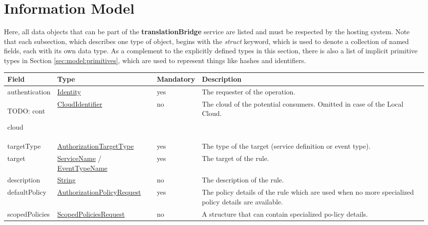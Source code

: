 \documentclass[a4paper]{arrowhead}
\newcommand{\pref}[1]{{\textcolor{ArrowheadGrey}{\hyperref[sec:model:primitives:#1]{#1}}}}
\begin{document}
\clearpage

\section{Information Model}
\label{sec:model}

Here, all data objects that can be part of the \textbf{translationBridge} service are listed and must be respected by the hosting system.
Note that each subsection, which describes one type of object, begins with the \textit{struct} keyword, which is used to denote a collection of named fields, each with its own data type.
As a complement to the explicitly defined types in this section, there is also a list of implicit primitive types in Section \ref{sec:model:primitives}, which are used to represent things like hashes and identifiers.

{}
 
\begin{table}[ht!]
\begin{tabularx}{\textwidth}{| p{3cm} | p{4.5cm} | p{2cm} | X |} \hline
\rowcolor{gray!33} Field & Type & Mandatory & Description \\ \hline
authentication &\hyperref[sec:model:Identity]{Identity} & yes & The requester of the operation. \\ \hline

TODO: cont

cloud & \pref{CloudIdentifier} & no & The cloud of the potential consumers. Omitted in case of the Local Cloud. \\ \hline
targetType & \pref{AuthorizationTargetType} & yes & The type of the target (service definition or event type). \\ \hline
target & \pref{ServiceName} / \pref{EventTypeName} & yes & The target of the rule. \\ \hline
description & \pref{String} & no & The description of the rule. \\ \hline
defaultPolicy & \hyperref[sec:model:AuthorizationPolicyRequest]{AuthorizationPolicyRequest} & yes & The policy details of the rule which are used when no more specialized policy details are available. \\ \hline
scopedPolicies & \hyperref[sec:model:ScopedPoliciesRequest]{ScopedPoliciesRequest} & no & A structure that can contain specialized po-licy details. \\ \hline
\end{tabularx}
\end{table}
\end{document}
